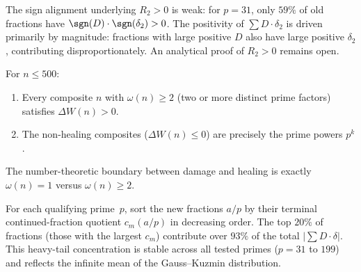 \begin{remark}
The sign alignment underlying $R_2>0$ is weak:
for $p=31$, only $59\%$ of old fractions have
$\sgn(D)\cdot\sgn(\delta_2)>0$.  The positivity of
$\sum D\cdot\delta_2$ is driven primarily by magnitude:
fractions with large positive $D$ also have large positive $\delta_2$,
contributing disproportionately.  An analytical proof of $R_2>0$
remains open.
\end{remark}


\begin{observation}\label{obs:composites}
For $n\le 500$:
\begin{enumerate}
\item Every composite $n$ with $\omega(n)\ge 2$
  (two or more distinct prime factors) satisfies $\Delta W(n) > 0$.
\item The non-healing composites ($\Delta W(n) \le 0$) are
  precisely the prime powers $p^k$.
\end{enumerate}
The number-theoretic boundary between damage and healing is exactly
$\omega(n) = 1$ versus $\omega(n)\ge 2$.
\end{observation}


\begin{observation}\label{obs:gk-conc}
For each qualifying prime~$p$, sort the new fractions $a/p$
by their terminal continued-fraction quotient $c_m(a/p)$
in decreasing order.  The top $20\%$ of fractions
(those with the largest $c_m$) contribute over $93\%$
of the total $|\sum D\cdot\delta|$.  This heavy-tail concentration
is stable across all tested primes ($p=31$ to $199$) and reflects
the infinite mean of the Gauss--Kuzmin distribution.
\end{observation}


